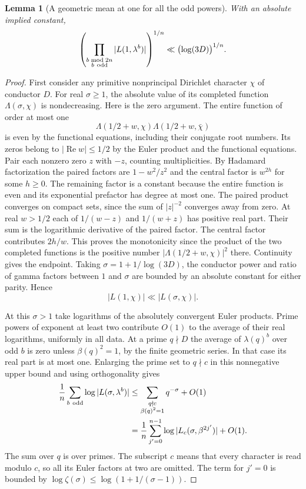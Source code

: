 \documentclass[a4paper,11pt]{article}
\newtheorem{lemma}[proposition]{Lemma}
\theoremstyle{definition}
\theoremstyle{remark}
\numberwithin{equation}{section}
\begin{document}
\begin{lemma}[A geometric mean at one for all the odd powers]
\leavevmode\label{lem:geometricmean542}
With an absolute implied constant,
\[
  \left(\prod_{\substack{b\bmod 2n\\b\ {\rm odd}}}
         |L(1,\lambda^b)|\right)^{1/n}
                    \ll \bigl(\log(3D)\bigr)^{1/n}.
\]
\end{lemma}
\begin{proof}
First consider any primitive nonprincipal Dirichlet character
\(\chi\) of conductor \(D\). For real \(\sigma\ge1\), the
absolute value of its completed function \(\Lambda(\sigma,\chi)\)
is nondecreasing. Here is the zero argument. The entire
function of order at most one
\[
   \Lambda(1/2+w,\chi)\Lambda(1/2+w,\bar\chi)
\]
is even by the functional equations, including their conjugate
root numbers. Its zeros belong to \(|\operatorname{Re}w|\le1/2\)
by the Euler product and the functional equations. Pair each
nonzero zero \(z\) with \(-z\), counting multiplicities. By
Hadamard factorization the paired factors are \(1-w^2/z^2\)
and the central factor is \(w^{2h}\) for some \(h\ge0\).
The remaining factor is a constant because the entire function
is even and its exponential prefactor has degree at most one.
The paired product converges on compact sets, since the sum
of \(|z|^{-2}\) converges away from zero. At real \(w>1/2\)
each of \(1/(w-z)\) and \(1/(w+z)\) has positive real part.
Their sum is the logarithmic derivative of the paired factor.
The central factor contributes \(2h/w\). This proves the
monotonicity since the product of the two completed functions
is the positive number \(|\Lambda(1/2+w,\chi)|^2\) there.
Continuity gives the endpoint. Taking
\(\sigma=1+1/\log(3D)\), the conductor power and ratio of
gamma factors between \(1\) and \(\sigma\) are bounded by an
absolute constant for either parity. Hence
\[
                   |L(1,\chi)|\ll |L(\sigma,\chi)|.
\]

At this \(\sigma>1\) take logarithms of the absolutely
convergent Euler products. Prime powers of exponent at least
two contribute \(O(1)\) to the average of their real logarithms,
uniformly in all data. At a prime \(q\nmid D\) the average of
\(\lambda(q)^b\) over odd \(b\) is zero unless
\(\beta(q)^2=1\), by the finite geometric series. In that case
its real part is at most one. Enlarging the prime set to
\(q\nmid c\) in this nonnegative upper bound and using
orthogonality gives
\[
 \begin{split}
 \frac1n\sum_{b\ {\rm odd}}\log |L(\sigma,\lambda^b)|
   &\le \sum_{\substack{q\nmid c\\\beta(q)^2=1}}q^{-\sigma}+O(1)\\
   &=\frac1n\sum_{j'=0}^{n-1}
               \log |L_c(\sigma,\beta^{2j'})|+O(1).
 \end{split}
\]
The sum over \(q\) is over primes. The subscript \(c\) means
that every character is read modulo \(c\), so all its Euler
factors at two are omitted. The term for \(j'=0\) is bounded
by \(\log\zeta(\sigma)\le\log(1+1/(\sigma-1))\).


\end{proof}
\end{document}

